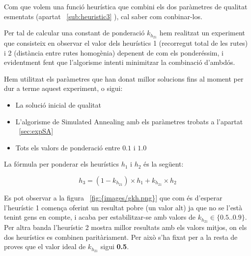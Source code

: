 
Com que volem una funció heurística que combini els dos paràmetres de qualitat esmentats (apartat ~\ref{sub:heuristic3}
), cal saber com conbinar-los. 

Per tal de calcular una constant de ponderació $k_{h_{21}}$ hem realitzat un experiment que consisteix en observar el valor dels heurístics 1 (recorregut total de les rutes) i 2 (distància entre rutes homogènia) depenent de com els ponderéssim, i evidentment fent que l'algorisme intenti minimitzar la combinació d'ambdós.

Hem utilitzat els paràmetres que han donat millor solucions fins al moment per dur a terme aquest experiment, o sigui:
\begin{itemize}
	\item La solució inicial de qualitat
	\item L'algorisme de Simulated Annealing amb els paràmetres trobats a l'apartat ~\ref{sec:expSA}
	\item Tots els valors de ponderació entre $0.1$ i $1.0$
\end{itemize}

La fórmula per ponderar els heurístics $h_1$ i $h_2$ és la següent:

\begin{center}
	\large
	\[
		h_3 = (1 - k_{h_{21}}) \times h_1 + k_{h_{21}} \times h_2
	\]
\end{center}


Es pot observar a la figura ~\ref{fig:{images/gkh.png}} que com és d'esperar l'heurístic 1 comença oferint un resultat pobre (un valor alt) ja que no se l'està tenint gens en compte, i acaba per estabilitzar-se amb valors de $k_{h_{21}} \in \{ 0.5 .. 0.9\}$. Per altra banda l'heurístic 2 mostra millor resultats amb els valors mitjos, on els dos heurístics es combinen paritàriament. Per això s'ha fixat per a la resta de proves que el valor ideal de $k_{h_{21}}$ sigui \textbf{0.5}.
